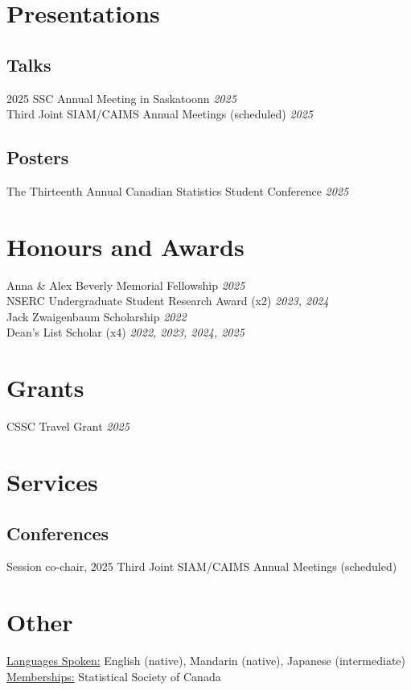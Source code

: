 \documentclass[11pt]{article}
\theoremstyle{definition}
\newcommand{\1}{\mathds 1}
\begin{document}
\section*{Presentations}
\subsection*{Talks}
2025 SSC Annual Meeting in Saskatoonn \hfill \textit{2025}\\
Third Joint SIAM/CAIMS Annual Meetings (scheduled) \hfill \textit{2025}

\subsection*{Posters}
The Thirteenth Annual Canadian Statistics Student Conference \hfill \textit{2025}

\section*{Honours and Awards}
Anna \& Alex Beverly Memorial Fellowship \hfill \textit{2025}\\
NSERC Undergraduate Student Research Award (x2) \hfill \textit{2023, 2024}\\
Jack Zwaigenbaum Scholarship \hfill \textit{2022}\\
Dean's List Scholar (x4) \hfill \textit{2022, 2023, 2024, 2025}

\section*{Grants}
CSSC Travel Grant \hfill \textit{2025}
\indent \hspace*{0.2cm} 

\section*{Services}
\subsection*{Conferences}
Session co-chair, 2025 Third Joint SIAM/CAIMS Annual Meetings (scheduled) 


\section*{Other}
\underline{Languages Spoken:} English (native), Mandarin (native), Japanese (intermediate)\\
\underline{Memberships:} Statistical Society of Canada
\end{document}
